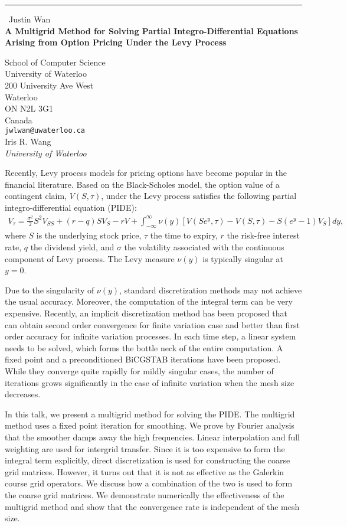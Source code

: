 \documentclass{report}
\begin{document}
\begin{center}
\rule{6in}{1pt} \
{\large Justin Wan \\
{\bf A Multigrid Method for Solving Partial Integro-Differential Equations Arising from Option Pricing Under the Levy Process}}

School of Computer Science \\ University of Waterloo \\ 200 University Ave West \\ Waterloo \\ ON N2L 3G1 \\ Canada
\\
{\tt jwlwan@uwaterloo.ca}\\
Iris R. Wang\\
{\em University of Waterloo}\end{center}

Recently, Levy process models for pricing options have become
popular in the financial literature. Based on the Black-Scholes
model, the option value of a contingent claim, $V(S,\tau)$,
under the Levy process satisfies the following partial
integro-differential equation (PIDE):
\begin{eqnarray*}
V_\tau =
\frac{\sigma^2}{2}S^2V_{SS} +
(r-q)SV_S - rV + \int_{-\infty}^{\infty} \nu(y)[V(Se^y,\tau) - V(S,\tau) -
S(e^y - 1) V_S]dy,
\end{eqnarray*}
where $S$ is the underlying stock price, $\tau$ the time to
expiry, $r$ the risk-free interest rate, $q$ the dividend yield,
and $\sigma$ the volatility associated with the continuous
component of Levy process. The Levy measure $\nu(y)$ is
typically singular at $y=0$.

Due to the singularity of $\nu(y)$, standard discretization
methods may not achieve the usual accuracy. Moreover, the
computation of the integral term can be very expensive.
Recently, an implicit discretization method has been proposed
that can obtain second order convergence for finite variation
case and better than first order accuracy for infinite variation
processes. In each time step, a linear system needs to be
solved, which forms the bottle neck of the entire computation.
A fixed point and a preconditioned BiCGSTAB iterations have been
proposed. While they converge quite rapidly for mildly singular
cases, the number of iterations grows significantly in the case
of infinite variation when the mesh size decreases.

In this talk, we present a multigrid method for solving the
PIDE. The multigrid method uses a fixed point iteration for
smoothing. We prove by Fourier analysis that the smoother damps
away the high frequencies. Linear interpolation and full
weighting are used for intergrid transfer. Since it is too
expensive to form the integral term explicitly, direct
discretization is used for constructing the coarse grid matrices.
However, it turns out that it is not as effective as the
Galerkin course grid operators. We discuss how a combination
of the two is used to form the coarse grid matrices. We
demonstrate numerically the effectiveness of the multigrid
method and show that the convergence rate is independent of the
mesh size.
\end{document}
